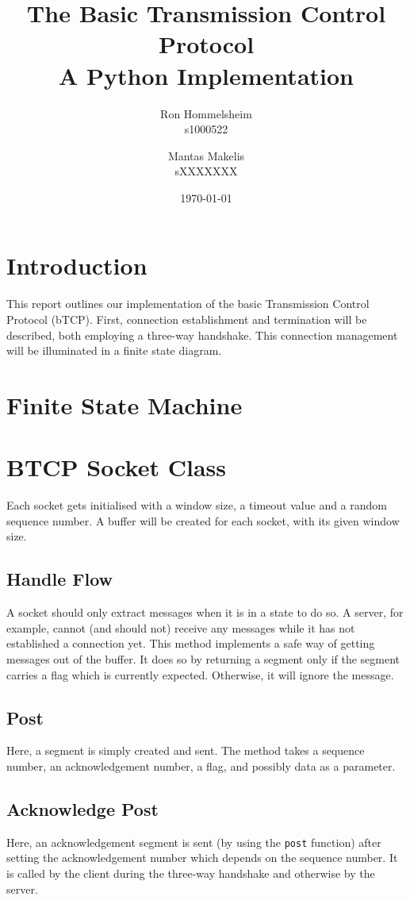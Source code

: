 \documentclass{article}
\title{The Basic Transmission Control Protocol \\ \large{A Python Implementation}}
\author{Ron Hommelsheim \\ s1000522 \and Mantas Makelis \\ sXXXXXXX}
\date{\today}
\begin{document}
\maketitle

\tableofcontents

\section{Introduction}
This report outlines our implementation of the basic Transmission Control Protocol (bTCP). 
First, connection establishment and termination will be described, both employing a three-way handshake. This connection management will be illuminated in a finite state diagram.


\section{Finite State Machine}

\section{BTCP Socket Class}
Each socket gets initialised with a window size, a timeout value and a random sequence number.
A buffer will be created for each socket, with its given window size. 

\subsection{Handle Flow}
A socket should only extract messages when it is in a state to do so. A server, for example, cannot (and should not) receive any messages while it has not established a connection yet. 
This method implements a safe way of getting messages out of the buffer. It does so by returning a segment only if the segment carries a flag which is currently expected. Otherwise, it will ignore the message. 

\subsection{Post}
Here, a segment is simply created and sent. The method takes a sequence number, an acknowledgement number, a flag, and possibly data as a parameter.

\subsection{Acknowledge Post}
Here, an acknowledgement segment is sent (by using the \texttt{post} function) after setting the acknowledgement number which depends on the sequence number. It is called by the client during the three-way handshake and otherwise by the server.
\end{document}
